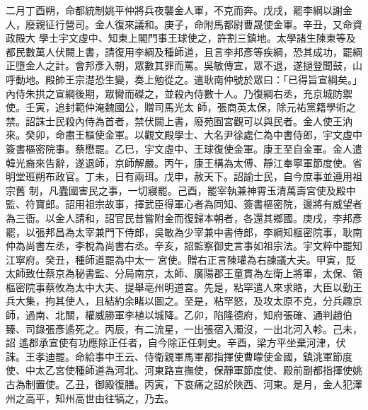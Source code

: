 \begin{pinyinscope}
 二月丁酉朔，命都統制姚平仲將兵夜襲金人軍，不克而奔。戊戌，罷李綱以謝金人，廢親征行營司。金人復來議和。庚子，命附馬都尉曹晟使金軍。辛丑，又命資政殿大
 學士宇文虛中、知東上閣門事王球使之，許割三鎮地。太學諸生陳東等及都民數萬人伏闕上書，請復用李綱及種師道，且言李邦彥等疾綱，恐其成功，罷綱正墮金人之計。會邦彥入朝，眾數其罪而罵。吳敏傳宣，眾不退，遂撾登聞鼓，山呼動地。殿帥王宗濋恐生變，奏上勉從之。遣耿南仲號於眾曰：「已得旨宣綱矣。」內侍朱拱之宣綱後期，眾臠而磔之，並殺內侍數十人。乃復綱右丞，充京城防禦使。壬寅，追封範仲淹魏國公，贈司馬光太
 師，張商英太保，除元祐黨籍學術之禁。詔誅士民殺內侍為首者，禁伏闕上書，廢苑囿宮觀可以與民者。金人使王汭來。癸卯，命肅王樞使金軍。以觀文殿學士、大名尹徐處仁為中書侍郎，宇文虛中簽書樞密院事。蔡懋罷。乙巳，宇文虛中、王球復使金軍。康王至自金軍。金人遣韓光裔來告辭，遂退師，京師解嚴。丙午，康王構為太傅、靜江奉寧軍節度使。省明堂班朔布政官。丁未，日有兩珥。戊申，赦天下。詔諭士民，自今庶事並遵用祖宗舊
 制，凡蠹國害民之事，一切寢罷。己酉，罷宰執兼神霄玉清萬壽宮使及殿中監、符寶郎。詔用祖宗故事，擇武臣得軍心者為同知、簽書樞密院，邊將有威望者為三衙。以金人請和，詔官民昔嘗附金而復歸本朝者，各還其鄉國。庚戌，李邦彥罷，以張邦昌為太宰兼門下侍郎，吳敏為少宰兼中書侍郎，李綱知樞密院事，耿南仲為尚書左丞，李梲為尚書右丞。辛亥，詔監察御史言事如祖宗法。宇文粹中罷知江寧府。癸丑，種師道罷為中太一
 宮使。贈右正言陳瓘為右諫議大夫。甲寅，貶太師致仕蔡京為秘書監、分局南京，太師、廣陽郡王童貫為左衛上將軍，太保、領樞密院事蔡攸為太中大夫、提舉亳州明道宮。先是，粘罕遣人來求賂，大臣以勤王兵大集，拘其使人，且結約余睹以圖之。至是，粘罕怒，及攻太原不克，分兵趣京師，過南、北關，權威勝軍李植以城降。乙卯，陷隆德府，知府張確、通判趙伯臻、司錄張彥遹死之。丙辰，有二流星，一出張宿入濁沒，一出北河入軫。己未，詔
 遙郡承宣使有功應除正任者，自今除正任刺史。辛酉，梁方平坐棄河津，伏誅。王孝迪罷。命給事中王云、侍衛親軍馬軍都指揮使曹曚使金國，鎮洮軍節度使、中太乙宮使種師道為河北、河東路宣撫使，保靜軍節度使、殿前副都指揮使姚古為制置使。乙丑，御殿復膳。丙寅，下哀痛之詔於陜西、河東。是月，金人犯澤州之高平，知州高世由往犒之，乃去。




\end{pinyinscope}
